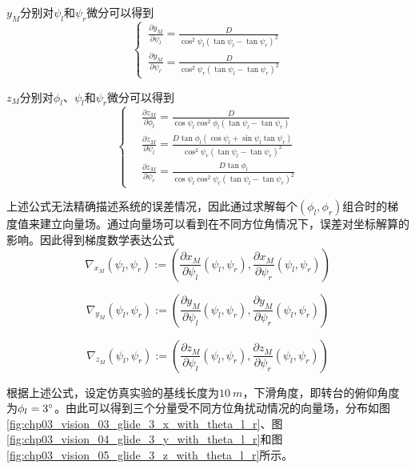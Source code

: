 $y_M$分别对$\psi_l$和$\psi_r$微分可以得到
\begin{equation}
\left\{ \,
\begin{aligned}
\frac{\partial y_M}{\partial \psi_l} = \frac{ D}{\cos^2 \psi_l (\tan \psi_l - \tan \psi_r)^2} \\
\frac{\partial y_M}{\partial \psi_r} = \frac{D}{\cos^2 \psi_r (\tan \psi_l - \tan \psi_r)^2} 
\end{aligned}
\right.	
\end{equation}

$z_M$分别对$\phi_l$、$\psi_l$和$\psi_r$微分可以得到
\begin{equation}
\left\{ \,
\begin{aligned}
&\frac{ \partial z_M}{ \partial \phi_l} = \frac{D}{ \cos \psi_l \cos^2 \phi_l (\tan \psi_l - \tan \psi_r)} \\
&\frac{\partial z_M}{\partial \psi_l} = \frac{ D \tan \phi_l(\cos \psi_l + \sin \psi_l \tan \psi_r)}{ \cos^2 \psi_r (\tan \psi_l - \tan \psi_r)^2} \\
&\frac{ \partial z_M}{ \partial \psi_r} = \frac{ D \tan \phi_l}{ \cos \psi_l \cos^2 \psi_r (\tan \psi_l - \tan \psi_r)^2}
\end{aligned}
\right.
\end{equation} 

上述公式无法精确描述系统的误差情况，因此通过求解每个$(\phi_l, \phi_r)$组合时的梯度值来建立向量场。通过向量场可以看到在不同方位角情况下，误差对坐标解算的影响。因此得到梯度数学表达公式
\begin{equation}
\nabla_{x_M}(\psi_l, \psi_r):=\left( \frac{\partial x_M}{\partial \psi_l}(\psi_l, \psi_r), \frac{\partial x_M}{\partial \psi_r}(\psi_l, \psi_r)  \right)
\end{equation}

\begin{equation}
\nabla_{y_M}(\psi_l, \psi_r):=\left( \frac{\partial y_M}{\partial \psi_l}(\psi_l, \psi_r), \frac{\partial y_M}{\partial \psi_r}(\psi_l, \psi_r)  \right)
\end{equation}

\begin{equation}
\nabla_{z_M}(\psi_l, \psi_r):=\left( \frac{\partial z_M}{\partial \psi_l}(\psi_l, \psi_r), \frac{\partial z_M}{\partial \psi_r}(\psi_l, \psi_r)  \right)
\end{equation}

根据上述公式，设定仿真实验的基线长度为$10\ m$，下滑角度，即转台的俯仰角度为$\phi_l=3\degree$。由此可以得到三个分量受不同方位角扰动情况的向量场，分布如图\ref{fig:chp03_vision_03_glide_3_x_with_theta_l_r}、图\ref{fig:chp03_vision_04_glide_3_y_with_theta_l_r}和图\ref{fig:chp03_vision_05_glide_3_z_with_theta_l_r}所示。

